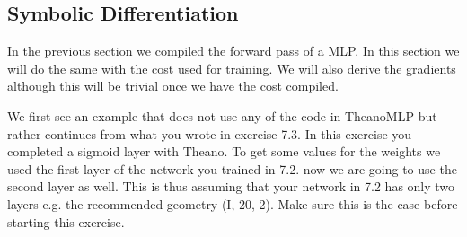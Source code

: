 \subsection{Symbolic Differentiation}
In the previous section we compiled the forward pass of a MLP. In this section
we will do the same with the cost used for training. We will also derive the
gradients although this will be trivial once we have the cost compiled.     
\begin{exercise}
We first see an example that does not use any of the code in TheanoMLP but
rather continues from what you wrote in exercise 7.3. In this exercise you
completed a sigmoid layer with Theano. To get some values for the weights we
used the first layer of the network you trained in 7.2. now we are going to use
the second layer as well. This is thus assuming that your network in 7.2 has
only two layers e.g. the recommended geometry (I, 20, 2). Make sure this is the
case before starting this exercise.  


\end{exercise}
